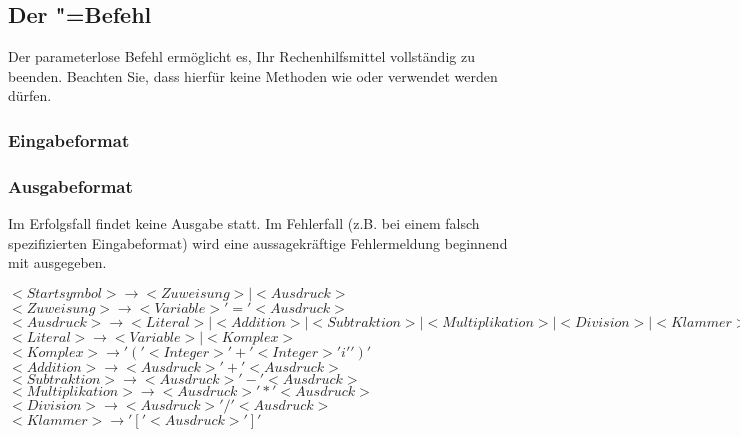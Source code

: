 \documentclass{sdqassignment}
\begin{document}
\subsection{Der "=Befehl}
Der parameterlose Befehl ermöglicht es, Ihr Rechenhilfsmittel vollständig zu beenden. Beachten Sie, dass hierfür keine Methoden wie  oder  verwendet werden dürfen.
\subsubsection{Eingabeformat}
\subsubsection{Ausgabeformat}
Im Erfolgsfall findet keine Ausgabe statt. Im Fehlerfall (z.B. bei einem falsch spezifizierten Eingabeformat) wird eine aussagekräftige Fehlermeldung beginnend mit  ausgegeben.




\(<Startsymbol> \rightarrow <Zuweisung> \mid <Ausdruck>\)
\(<Zuweisung> \rightarrow <Variable> '=' <Ausdruck>\)
\(<Ausdruck> \rightarrow <Literal> \mid <Addition> \mid <Subtraktion> \mid <Multiplikation> \mid <Division> \mid <Klammer>\)
\(<Literal> \rightarrow <Variable> \mid <Komplex>\)
\(<Komplex> \rightarrow '(' <Integer> '+' <Integer> 'i' ')'\)
\(<Addition> \rightarrow <Ausdruck> '+' <Ausdruck>\)
\(<Subtraktion> \rightarrow <Ausdruck> '-' <Ausdruck>\)
\(<Multiplikation> \rightarrow <Ausdruck> '*' <Ausdruck>\)
\(<Division> \rightarrow <Ausdruck> '/' <Ausdruck>\)
\(<Klammer> \rightarrow '[' <Ausdruck> ']'\)
\end{document}
